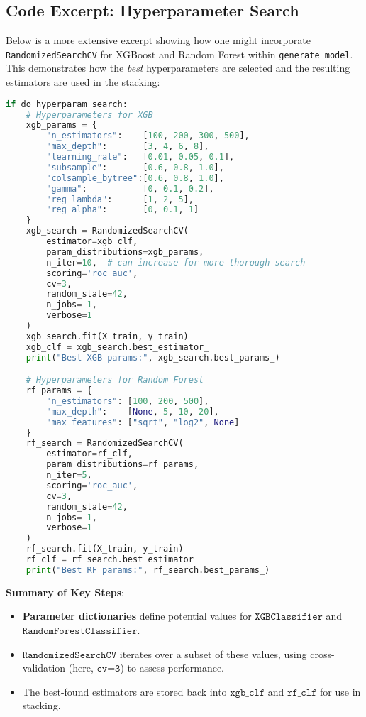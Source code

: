 \documentclass[12pt]{article}
\begin{document}
\subsection{Code Excerpt: Hyperparameter Search}
Below is a more extensive excerpt showing how one might incorporate \texttt{RandomizedSearchCV} for XGBoost and Random Forest within \texttt{generate\_model}. This demonstrates how the \emph{best} hyperparameters are selected and the resulting estimators are used in the stacking:

\begin{lstlisting}[language=Python]
if do_hyperparam_search:
    # Hyperparameters for XGB
    xgb_params = {
        "n_estimators":    [100, 200, 300, 500],
        "max_depth":       [3, 4, 6, 8],
        "learning_rate":   [0.01, 0.05, 0.1],
        "subsample":       [0.6, 0.8, 1.0],
        "colsample_bytree":[0.6, 0.8, 1.0],
        "gamma":           [0, 0.1, 0.2],
        "reg_lambda":      [1, 2, 5],
        "reg_alpha":       [0, 0.1, 1]
    }
    xgb_search = RandomizedSearchCV(
        estimator=xgb_clf,
        param_distributions=xgb_params,
        n_iter=10,  # can increase for more thorough search
        scoring='roc_auc',
        cv=3,
        random_state=42,
        n_jobs=-1,
        verbose=1
    )
    xgb_search.fit(X_train, y_train)
    xgb_clf = xgb_search.best_estimator_
    print("Best XGB params:", xgb_search.best_params_)

    # Hyperparameters for Random Forest
    rf_params = {
        "n_estimators": [100, 200, 500],
        "max_depth":    [None, 5, 10, 20],
        "max_features": ["sqrt", "log2", None]
    }
    rf_search = RandomizedSearchCV(
        estimator=rf_clf,
        param_distributions=rf_params,
        n_iter=5,
        scoring='roc_auc',
        cv=3,
        random_state=42,
        n_jobs=-1,
        verbose=1
    )
    rf_search.fit(X_train, y_train)
    rf_clf = rf_search.best_estimator_
    print("Best RF params:", rf_search.best_params_)
\end{lstlisting}

\noindent
\textbf{Summary of Key Steps}:
\begin{itemize}
    \item \textbf{Parameter dictionaries} define potential values for \(\texttt{XGBClassifier}\) and \(\texttt{RandomForestClassifier}\).
    \item \(\texttt{RandomizedSearchCV}\) iterates over a subset of these values, using cross-validation (here, \(\texttt{cv=3}\)) to assess performance.
    \item The best-found estimators are stored back into \(\texttt{xgb\_clf}\) and \(\texttt{rf\_clf}\) for use in stacking.
\end{itemize}
\end{document}
